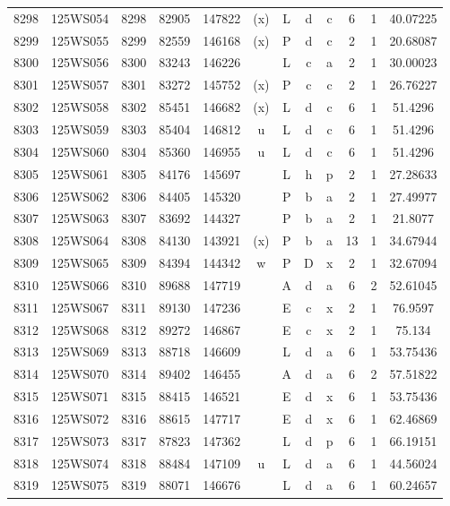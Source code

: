 \begin{tabular}{|*{12}{c|}}
8298 & 125WS054 & 8298 & 82905 & 147822 & (x) & L & d & c & 6 & 1 & 40.07225 \\ 
8299 & 125WS055 & 8299 & 82559 & 146168 & (x) & P & d & c & 2 & 1 & 20.68087 \\ 
8300 & 125WS056 & 8300 & 83243 & 146226 &  & L & c & a & 2 & 1 & 30.00023 \\ 
8301 & 125WS057 & 8301 & 83272 & 145752 & (x) & P & c & c & 2 & 1 & 26.76227 \\ 
8302 & 125WS058 & 8302 & 85451 & 146682 & (x) & L & d & c & 6 & 1 & 51.4296 \\ 
8303 & 125WS059 & 8303 & 85404 & 146812 & u & L & d & c & 6 & 1 & 51.4296 \\ 
8304 & 125WS060 & 8304 & 85360 & 146955 & u & L & d & c & 6 & 1 & 51.4296 \\ 
8305 & 125WS061 & 8305 & 84176 & 145697 &  & L & h & p & 2 & 1 & 27.28633 \\ 
8306 & 125WS062 & 8306 & 84405 & 145320 &  & P & b & a & 2 & 1 & 27.49977 \\ 
8307 & 125WS063 & 8307 & 83692 & 144327 &  & P & b & a & 2 & 1 & 21.8077 \\ 
8308 & 125WS064 & 8308 & 84130 & 143921 & (x) & P & b & a & 13 & 1 & 34.67944 \\ 
8309 & 125WS065 & 8309 & 84394 & 144342 & w & P & D & x & 2 & 1 & 32.67094 \\ 
8310 & 125WS066 & 8310 & 89688 & 147719 &  & A & d & a & 6 & 2 & 52.61045 \\ 
8311 & 125WS067 & 8311 & 89130 & 147236 &  & E & c & x & 2 & 1 & 76.9597 \\ 
8312 & 125WS068 & 8312 & 89272 & 146867 &  & E & c & x & 2 & 1 & 75.134 \\ 
8313 & 125WS069 & 8313 & 88718 & 146609 &  & L & d & a & 6 & 1 & 53.75436 \\ 
8314 & 125WS070 & 8314 & 89402 & 146455 &  & A & d & a & 6 & 2 & 57.51822 \\ 
8315 & 125WS071 & 8315 & 88415 & 146521 &  & E & d & x & 6 & 1 & 53.75436 \\ 
8316 & 125WS072 & 8316 & 88615 & 147717 &  & E & d & x & 6 & 1 & 62.46869 \\ 
8317 & 125WS073 & 8317 & 87823 & 147362 &  & L & d & p & 6 & 1 & 66.19151 \\ 
8318 & 125WS074 & 8318 & 88484 & 147109 & u & L & d & a & 6 & 1 & 44.56024 \\ 
8319 & 125WS075 & 8319 & 88071 & 146676 &  & L & d & a & 6 & 1 & 60.24657 \\ 

\end{tabular}
